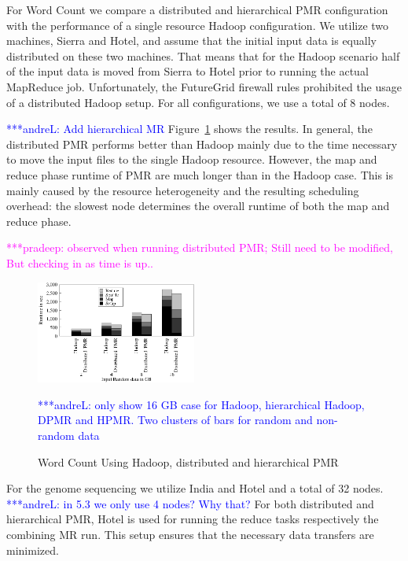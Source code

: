 \documentclass{acm_proc_article-sp}
\newcommand{\alnote}[1]{ {\textcolor{blue} { ***andreL: #1 }}}
\newcommand{\pnote}[1]{ {\textcolor{magenta} { ***pradeep: #1 }}}
\newcommand{\alnote}[1]{}
\newcommand{\pnote}[1]{}
\begin{document}
For Word Count we compare a distributed and hierarchical PMR configuration with
the performance of a single resource Hadoop configuration. We utilize two
machines, Sierra and Hotel, and assume that the initial input data is equally
distributed on these two machines. That means that for the Hadoop scenario half 
of the input data is moved from Sierra to Hotel prior to running the actual 
MapReduce job. Unfortunately, the FutureGrid firewall rules prohibited the usage 
of a distributed Hadoop setup. For all configurations, we use a total of 8 
nodes. 

\alnote{Add hierarchical MR}
Figure~\ref{fig:hadoopvsdistp} shows the results. In general, the distributed 
PMR performs better than Hadoop mainly due to the time necessary to move the 
input files to the single Hadoop resource. However, the map and reduce phase 
runtime of PMR are much longer than in the Hadoop case. This is mainly caused by 
the resource heterogeneity and the resulting scheduling overhead: the slowest node determines the overall runtime of both the map and reduce phase.

\pnote{observed when running distributed PMR; Still need to be modified, But 
checking in as time is up..}


\begin{figure}[ht]
	\centering
		\includegraphics[width=0.47\textwidth]{figures/wc_hmrvspmr_random.png}
\caption{Word Count Using Hadoop, distributed and hierarchical PMR} 	
\alnote{only show 16 GB case for Hadoop, hierarchical Hadoop, DPMR and HPMR. Two clusters of bars for random and non-random data}
\label{fig:hadoopvsdistp}
\end{figure}		


For the genome sequencing we utilize India and Hotel and a total of 32 nodes.
\alnote{in 5.3 we only use 4 nodes? Why that?} For both distributed and
hierarchical PMR, Hotel is used for running the reduce tasks respectively the
combining MR run. This setup ensures that the necessary data transfers are
minimized.

\end{document}
